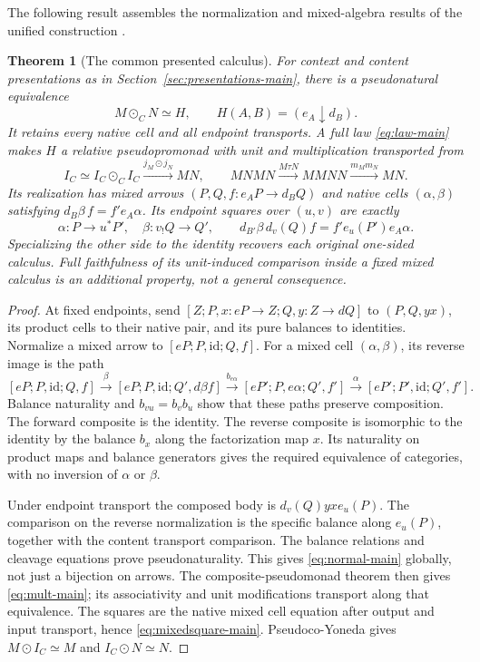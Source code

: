 \documentclass[11pt]{article}
\numberwithin{equation}{section}
\newtheorem{theorem}{Theorem}[section]
\theoremstyle{definition}\newtheorem{definition}[theorem]{Definition}
\newcommand{\id}{\mathrm{id}}\newcommand{\op}{\mathrm{op}}\newcommand{\dom}{\mathrm{dom}}\newcommand{\cod}{\mathrm{cod}}
\begin{document}
The following result assembles the normalization and mixed-algebra results
of the unified construction \cite{U}.
\begin{theorem}[The common presented calculus]\label{thm:unification}
For context and content presentations as in
Section~\ref{sec:presentations-main}, there is a pseudonatural equivalence
\begin{equation}\label{eq:normal-main}
 M\odot_CN\simeq H,\qquad H(A,B)=(e_A\downarrow d_B).
\end{equation}
It retains every native cell and all endpoint transports. A full law
\eqref{eq:law-main} makes $H$ a relative pseudopromonad with unit and
multiplication transported from
\begin{equation}\label{eq:mult-main}
 I_C\simeq I_C\odot_CI_C\xrightarrow{j_M\odot j_N}MN,
 \qquad MNMN\xrightarrow{M\tau N}MMNN\xrightarrow{m_Mm_N}MN.
\end{equation}
Its realization has mixed arrows $(P,Q,f:e_AP\to d_BQ)$ and native cells
$(\alpha,\beta)$ satisfying $d_B\beta\,f=f'e_A\alpha$. Its endpoint
squares over $(u,v)$ are exactly
\begin{equation}\label{eq:mixedsquare-main}
 \alpha:P\to u^*P',\quad\beta:v_!Q\to Q',\qquad
 d_{B'}\beta\,d_v(Q)f=f'e_u(P')e_A\alpha.
\end{equation}
Specializing the other side to the identity recovers each original
one-sided calculus. Full faithfulness of its unit-induced comparison inside
a fixed mixed calculus is an additional property, not a general consequence.
\end{theorem}
\begin{proof}
At fixed endpoints, send
$[Z;P,x:eP\to Z;Q,y:Z\to dQ]$ to $(P,Q,yx)$, its product cells to
their native pair, and its pure balances to identities. Normalize a mixed
arrow to $[eP;P,\id;Q,f]$. For a mixed cell $(\alpha,\beta)$, its
reverse image is the path
\[
 [eP;P,\id;Q,f]\xrightarrow{\beta}
 [eP;P,\id;Q',d\beta f]
 \xrightarrow{b_{e\alpha}}
 [eP';P,e\alpha;Q',f']\xrightarrow{\alpha}
 [eP';P',\id;Q',f'].
\]
Balance naturality and $b_{vu}=b_vb_u$ show that these paths preserve
composition. The forward composite is the identity. The reverse composite
is isomorphic to the identity by the balance $b_x$ along the factorization
map $x$. Its naturality on product maps and balance generators gives the
required equivalence of categories, with no inversion of $\alpha$ or
$\beta$.

Under endpoint transport the composed body is
$d_v(Q)yx e_u(P)$. The comparison on the reverse normalization is the
specific balance along $e_u(P)$, together with the content transport
comparison. The balance relations and cleavage equations prove
pseudonaturality. This gives \eqref{eq:normal-main} globally, not just a
bijection on arrows. The composite-pseudomonad theorem then gives
\eqref{eq:mult-main}; its associativity and unit modifications transport
along that equivalence. The squares are the native mixed cell equation
after output and input transport, hence \eqref{eq:mixedsquare-main}.
Pseudoco-Yoneda gives $M\odot I_C\simeq M$ and $I_C\odot N\simeq N$.
\end{proof}
\end{document}
